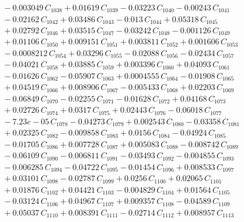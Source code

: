 \documentclass[a4paper,11pt]{article}
\begin{document}
\begin{align}
&\quad - 0.003049\,C_{1038} + 0.01619\,C_{1039} - 0.03223\,C_{1040} - 0.00243\,C_{1041} \nonumber\\
&\quad - 0.02162\,C_{1042} + 0.03486\,C_{1043} - 0.013\,C_{1044} + 0.05318\,C_{1045} \nonumber\\
&\quad + 0.02792\,C_{1046} + 0.03515\,C_{1047} - 0.03242\,C_{1048} - 0.001126\,C_{1049} \nonumber\\
&\quad + 0.01106\,C_{1050} + 0.009151\,C_{1051} + 0.003811\,C_{1052} + 0.001606\,C_{1053} \nonumber\\
&\quad - 0.0008212\,C_{1054} + 0.03296\,C_{1055} - 0.02088\,C_{1056} - 0.02434\,C_{1057} \nonumber\\
&\quad - 0.04021\,C_{1058} + 0.03885\,C_{1059} + 0.003396\,C_{1060} + 0.04093\,C_{1061} \nonumber\\
&\quad - 0.01626\,C_{1062} - 0.05907\,C_{1063} + 0.0004555\,C_{1064} - 0.01908\,C_{1065} \nonumber\\
&\quad + 0.04519\,C_{1066} + 0.008906\,C_{1067} - 0.005433\,C_{1068} + 0.02203\,C_{1069} \nonumber\\
&\quad - 0.06849\,C_{1070} - 0.02255\,C_{1071} - 0.01628\,C_{1072} + 0.04168\,C_{1073} \nonumber\\
&\quad + 0.02726\,C_{1074} + 0.0317\,C_{1075} + 0.02443\,C_{1076} - 0.06018\,C_{1077} \nonumber\\
&\quad - 7.23e-05\,C_{1078} - 0.04273\,C_{1079} + 0.002543\,C_{1080} - 0.03358\,C_{1081} \nonumber\\
&\quad + 0.02325\,C_{1082} - 0.009858\,C_{1083} + 0.0156\,C_{1084} - 0.04924\,C_{1085} \nonumber\\
&\quad - 0.01705\,C_{1086} + 0.007728\,C_{1087} + 0.005083\,C_{1088} - 0.008742\,C_{1089} \nonumber\\
&\quad - 0.06109\,C_{1090} - 0.006811\,C_{1091} - 0.03493\,C_{1092} - 0.004855\,C_{1093} \nonumber\\
&\quad - 0.006285\,C_{1094} - 0.04722\,C_{1095} - 0.01454\,C_{1096} + 0.008533\,C_{1097} \nonumber\\
&\quad + 0.03101\,C_{1098} - 0.02787\,C_{1099} + 0.0256\,C_{1100} + 0.02065\,C_{1101} \nonumber\\
&\quad + 0.01876\,C_{1102} + 0.04421\,C_{1103} - 0.004829\,C_{1104} + 0.01564\,C_{1105} \nonumber\\
&\quad - 0.03124\,C_{1106} + 0.04967\,C_{1107} + 0.009357\,C_{1108} - 0.04589\,C_{1109} \nonumber\\
&\quad + 0.05037\,C_{1110} + 0.008391\,C_{1111} - 0.02714\,C_{1112} + 0.008957\,C_{1113} \nonumber\\

\end{align}
\end{document}
